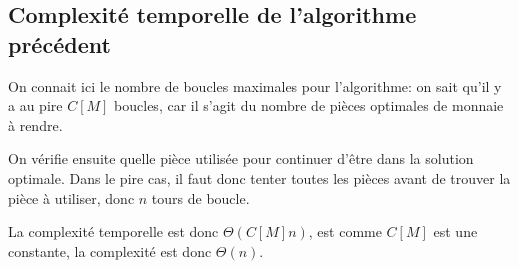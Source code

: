 \documentclass[10.9pt]{article} %
\begin{document}
\begin{algorithm}
\end{algorithm}

\subsection{Complexité temporelle de l'algorithme précédent}

On connait ici le nombre de boucles maximales pour l'algorithme: on sait qu'il y 
a au pire $C[M]$ boucles, car il s'agit du nombre de pièces optimales de monnaie
à rendre.

On vérifie ensuite quelle pièce utilisée pour continuer d'être dans la solution
optimale. Dans le pire cas, il faut donc tenter toutes les pièces avant de
trouver la pièce à utiliser, donc $n$ tours de boucle.

La complexité temporelle est donc $\Theta(C[M]n)$, est comme $C[M]$ est une constante,
la complexité est donc $\Theta(n)$.
\end{document}
